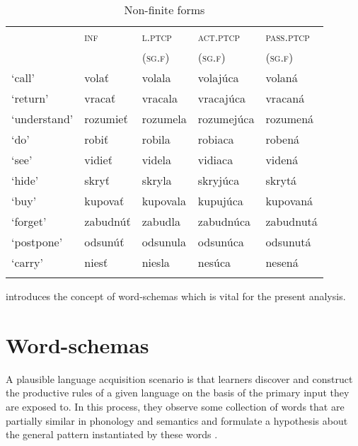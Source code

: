 \documentclass[output=paper,colorlinks,citecolor=brown]{langscibook}
\begin{document}
\begin{table}
\caption{Non-finite forms}
\label{tab:pitsch:4}
 \begin{tabular}{lllll}
  \lsptoprule
  & \textsc{inf} & \textsc{l.ptcp} & \textsc{act.ptcp} & \textsc{pass.ptcp} \\
  & & \textsc{(sg.f)} & \textsc{(sg.f)} & \textsc{(sg.f)} \\
  \midrule
  `call' & volať & volala & volajúca & volaná \\
  `return' & vracať & vracala & vracajúca & vracaná \\
  `understand' & rozumieť & rozumela & rozumejúca & rozumená \\
  `do' & robiť & robila & robiaca & robená \\
  `see' & vidieť & videla & vidiaca & videná \\
  `hide' & skryť & skryla & skryjúca & skrytá \\
  `buy' & kupovať & kupovala & kupujúca & kupovaná \\
  `forget' & zabudnúť & zabudla & zabudnúca & zabudnutá \\
  `postpone' & odsunúť & odsunula & odsunúca & odsunutá \\
  `carry' & niesť & niesla & nesúca & nesená \\ 
  \lspbottomrule
 \end{tabular}
\end{table}

 introduces the concept of word-schemas which is vital for the present analysis.


\section{Word-schemas}\label{sec:Schemas}

A plausible language acquisition scenario is that learners discover and construct the productive rules of a given language on the basis of the primary input they are exposed to. In this process, they observe some collection of words that are partially similar in phonology and semantics and formulate a hypothesis about the general pattern instantiated by these words \citep[see, e.g.,][]{Haspelmath2002,Tomasello2003,Culicover.Nowak2003,HaspelmathSims2010,Jackendoff.Audring2018}.
\end{document}
